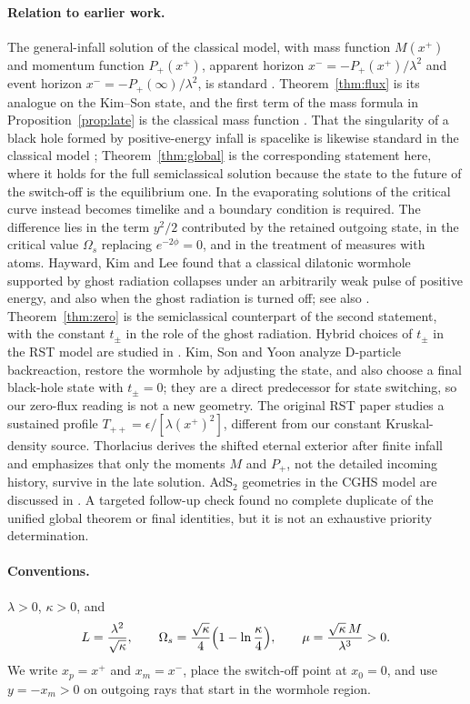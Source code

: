 \documentclass[11pt]{article}
\theoremstyle{remark}
\begin{document}
\paragraph{Relation to earlier work.}
The general-infall solution of the classical model, with mass function $M(x^+)$ and momentum function $P_+(x^+)$, apparent horizon $x^-=-P_+(x^+)/\lambda^2$ and event horizon $x^-=-P_+(\infty)/\lambda^2$, is standard \cite{RST,Thorlacius,Strominger}. Theorem~\ref{thm:flux} is its analogue on the Kim--Son state, and the first term of the mass formula in Proposition~\ref{prop:late} is the classical mass function \cite{Thorlacius}. That the singularity of a black hole formed by positive-energy infall is spacelike is likewise standard in the classical model \cite{CGHS,Strominger}; Theorem~\ref{thm:global} is the corresponding statement here, where it holds for the full semiclassical solution because the state to the future of the switch-off is the equilibrium one. In the evaporating solutions of \cite{RST} the critical curve instead becomes timelike and a boundary condition is required. The difference lies in the term $y^2/2$ contributed by the retained outgoing state, in the critical value $\Omega_s$ replacing $e^{-2\phi}=0$, and in the treatment of measures with atoms. Hayward, Kim and Lee \cite{HKL} found that a classical dilatonic wormhole supported by ghost radiation collapses under an arbitrarily weak pulse of positive energy, and also when the ghost radiation is turned off; see also \cite{Koyama}. Theorem~\ref{thm:zero} is the semiclassical counterpart of the second statement, with the constant $t_\pm$ in the role of the ghost radiation. Hybrid choices of $t_\pm$ in the RST model are studied in \cite{Potaux}. Kim, Son and Yoon \cite{KimSonYoon} analyze D-particle backreaction, restore the wormhole by adjusting the state, and also choose a final black-hole state with $t_\pm=0$; they are a direct predecessor for state switching, so our zero-flux reading is not a new geometry. The original RST paper studies a sustained profile $T_{++}=\epsilon/[\lambda(x^+)^2]$, different from our constant Kruskal-density source. Thorlacius derives the shifted eternal exterior after finite infall and emphasizes that only the moments $M$ and $P_+$, not the detailed incoming history, survive in the late solution. AdS$_2$ geometries in the CGHS model are discussed in \cite{KimAdS}. A targeted follow-up check found no complete duplicate of the unified global theorem or final identities, but it is not an exhaustive priority determination.

\paragraph{Conventions.} $\lambda>0$, $\kappa>0$, and
\[
L=\frac{\lambda^2}{\sqrt\kappa},\qquad \Omega_s=\frac{\sqrt\kappa}{4}\Bigl(1-\ln\frac\kappa4\Bigr),\qquad \mu=\frac{\sqrt\kappa\,M}{\lambda^3}>0 .
\]
We write $x_p=x^+$ and $x_m=x^-$, place the switch-off point at $x_0=0$, and use $y=-x_m>0$ on outgoing rays that start in the wormhole region.
\end{document}
